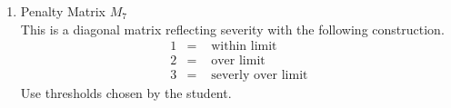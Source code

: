 \documentclass{ximera}
\begin{document}
\begin{enumerate}
    Since \(M_4\) is a vector and \(M_5\) is a matrix, we first convert \(M_4\) into a diagonal matrix:
    \[
    \widetilde{M}_4=
    \begin{bmatrix}
    141&0&0&0&0&0&0\\
    0&247&0&0&0&0&0\\
    0&0&244&0&0&0&0\\
    0&0&0&186&0&0&0\\
    0&0&0&0&224.5&0&0\\
    0&0&0&0&0&183&0\\
    0&0&0&0&0&0&166
    \end{bmatrix}.
    \]

    Then
    \[
    M_6=\widetilde{M}_4-M_5
    =
    \begin{bmatrix}
    141&0&0&0&0&0&0\\
    0&247&0&0&0&0&0\\
    0&0&244&0&0&0&0\\
    0&0&0&186&0&0&0\\
    0&0&0&0&224.5&0&0\\
    0&0&0&0&0&183&0\\
    0&0&0&0&0&0&166
    \end{bmatrix}
    -
    \begin{bmatrix}
    260&0&0&0&0&0&0\\
    0&220&0&0&0&0&0\\
    0&0&220&0&0&0&0\\
    0&0&0&180&0&0&0\\
    0&0&0&0&190&0&0\\
    0&0&0&0&0&170&0\\
    0&0&0&0&0&0&150
    \end{bmatrix}
    \]
    \[
    =
    \begin{bmatrix}
    -119&0&0&0&0&0&0\\
    0&27&0&0&0&0&0\\
    0&0&24&0&0&0&0\\
    0&0&0&6&0&0&0\\
    0&0&0&0&34.5&0&0\\
    0&0&0&0&0&13&0\\
    0&0&0&0&0&0&16
    \end{bmatrix}.
    \]

    \item Penalty Matrix $M_7$\\
    This is a diagonal matrix reflecting severity with the following construction.
    \begin{eqnarray*}
        1 & = & \mbox{ within limit} \\
        2 & = & \mbox{ over limit} \\
        3 & = & \mbox{ severly over limit} 
    \end{eqnarray*}
    Use thresholds chosen by the student.\\


\end{enumerate}
\end{document}
